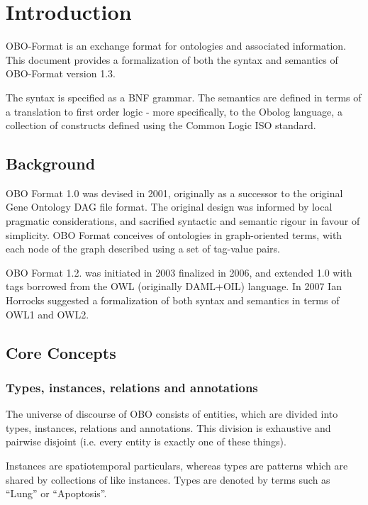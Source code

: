 \section{Introduction}

OBO-Format is an exchange format for ontologies and associated
information. This document provides a formalization of both the syntax
and semantics of OBO-Format version 1.3.

The syntax is specified as a BNF grammar. The semantics are defined in
terms of a translation to first order logic - more specifically, to
the Obolog language, a collection of constructs defined using the
Common Logic ISO standard.

\subsection{Background}

OBO Format 1.0 was devised in 2001, originally as a successor to the
original Gene Ontology DAG file format. The original design was
informed by local pragmatic considerations, and sacrified syntactic
and semantic rigour in favour of simplicity. OBO Format conceives of
ontologies in graph-oriented terms, with each node of the graph
described using a set of tag-value pairs.

OBO Format 1.2. was initiated in 2003 finalized in 2006, and extended
1.0 with tags borrowed from the OWL (originally DAML+OIL)
language. In 2007 Ian Horrocks suggested a formalization of both syntax and
semantics in terms of OWL1 and OWL2.

\subsection{Core Concepts}

\subsubsection{Types, instances, relations and annotations}

The universe of discourse of OBO consists of entities, which are
divided into types, instances, relations and annotations. This
division is exhaustive and pairwise disjoint (i.e. every entity is
exactly one of these things).

Instances are spatiotemporal particulars, whereas types are patterns
which are shared by collections of like instances. Types are denoted
by terms such as ``Lung'' or ``Apoptosis''.

